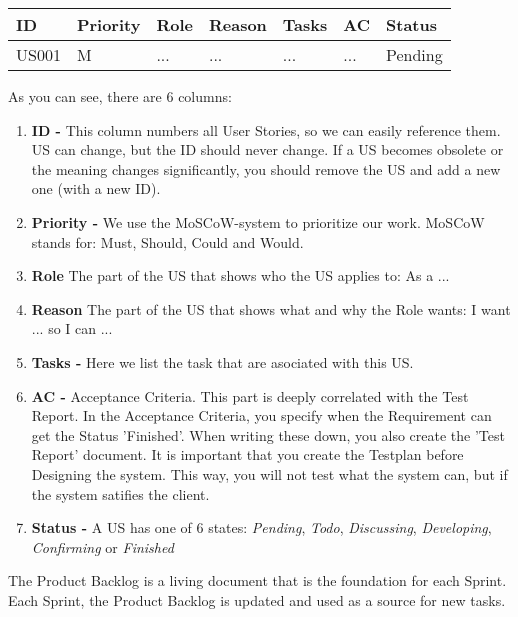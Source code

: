 \documentclass[10pt]{report}
\begin{document}
\medskip
\begin{tabularx}{0.8\textwidth} { 
  | >{\raggedright\arraybackslash}X 
  | >{\centering\arraybackslash}X 
  | >{\raggedright\arraybackslash}X 
  | >{\raggedright\arraybackslash}X 
  | >{\raggedright\arraybackslash}X 
  | >{\raggedright\arraybackslash}X 
  | >{\raggedleft\arraybackslash}X | }
 \hline
 ID & Priority & Role & Reason & Tasks & AC & Status \\
 \hline
 US001 & M & ... & ...  & ... & ... & Pending \\
 \hline
\end{tabularx}
\medskip

\noindent As you can see, there are 6 columns:

\begin{enumerate}
	\item \textbf{ID -} This column numbers all User Stories, so we can easily reference them. US can change, but the ID should never change. If a US becomes obsolete or the meaning changes significantly, you should remove the US and add a new one (with a new ID).
	\item \textbf{Priority -} We use the MoSCoW-system to prioritize our work. MoSCoW stands for: Must, Should, Could and Would.
	\item \textbf{Role} The part of the US that shows who the US applies to: As a ...
	\item \textbf{Reason} The part of the US that shows what and why the Role wants: I want ... so I can ...
	\item \textbf{Tasks -} Here we list the task that are asociated with this US.
	\item \textbf{AC -} Acceptance Criteria. This part is deeply correlated with the Test Report. In the Acceptance Criteria, you specify when the Requirement can get the Status 'Finished'. When writing these down, you also create the 'Test Report' document. It is important that you create the Testplan before Designing the system. This way, you will not test what the system can, but if the system satifies the client.
	\item \textbf{Status -} A US has one of 6 states: 
		\emph{Pending}, \emph{Todo}, \emph{Discussing}, \emph{Developing}, \emph{Confirming} or \emph{Finished}
\end{enumerate}

\noindent The Product Backlog is a living document that is the foundation for each Sprint. Each Sprint, the Product Backlog is updated and used as a source for new tasks.
\end{document}
